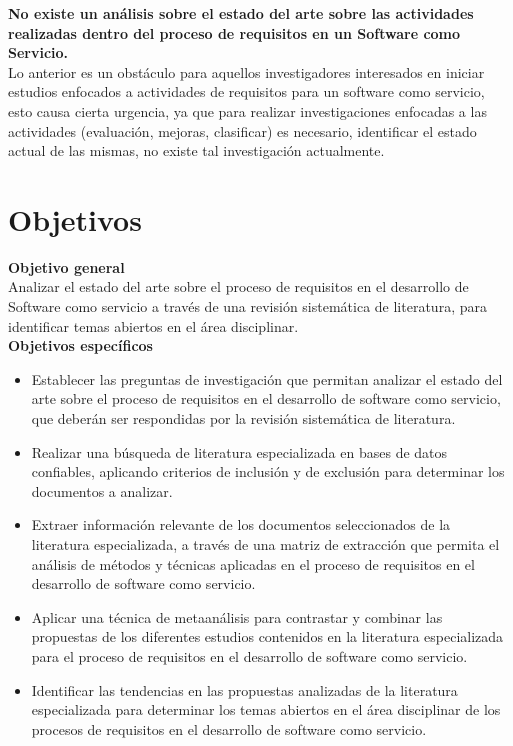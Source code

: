 \documentclass{article}
\begin{document}
\textbf{No existe un análisis sobre el estado del arte sobre las actividades realizadas dentro del proceso de requisitos en un Software como Servicio.}\\

Lo anterior es un obstáculo para aquellos investigadores interesados en iniciar estudios enfocados a actividades de requisitos para un software como servicio, 
esto causa cierta urgencia, ya que para realizar investigaciones enfocadas a las actividades (evaluación, mejoras, clasificar) es necesario, identificar el estado actual de las mismas, no existe tal 
investigación actualmente.


\newpage

\section{Objetivos}
\textbf{Objetivo general} \\

Analizar el estado del arte sobre el proceso de requisitos en el desarrollo de Software como servicio a través de una revisión sistemática de literatura, para identificar temas abiertos en el área disciplinar. \\

\textbf{Objetivos específicos} \\

\begin{itemize}
    \item Establecer las preguntas de investigación que permitan analizar el estado del arte sobre el proceso de requisitos en el desarrollo de software como servicio, que deberán ser respondidas por la revisión sistemática de literatura.
    \item Realizar una búsqueda de literatura especializada en bases de datos confiables, aplicando criterios de inclusión y de exclusión para determinar los documentos a analizar.
    \item Extraer información relevante de los documentos seleccionados de la literatura especializada, a través de una matriz de extracción que permita el análisis de métodos y técnicas aplicadas en el proceso de requisitos en el desarrollo de software como servicio.
    \item Aplicar una técnica de metaanálisis para contrastar y combinar las propuestas de los diferentes estudios contenidos en la literatura especializada para el proceso de requisitos en el desarrollo de software como servicio.
    \item Identificar las tendencias en las propuestas analizadas de la literatura especializada para determinar los temas abiertos en el área disciplinar de los procesos de requisitos en el desarrollo de software como servicio.
\end{itemize}
\end{document}
